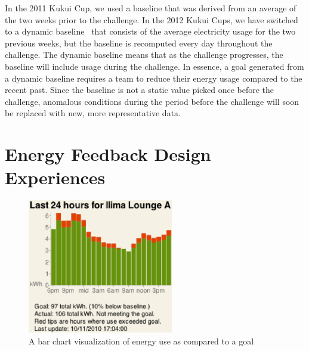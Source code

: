 \documentclass[10pt, conference, compsocconf]{IEEEtran}
\begin{document}
In the 2011 Kukui Cup, we used a baseline that was derived from an average of the two weeks prior to the challenge. In the 2012 Kukui Cups, we have switched to a dynamic baseline~\cite{csdl2-12-08} that consists of the average electricity usage for the two previous weeks, but the baseline is recomputed every day throughout the challenge. The dynamic baseline means that as the challenge progresses, the baseline will include usage during the challenge. In essence, a goal generated from a dynamic baseline requires a team to reduce their energy usage compared to the recent past. Since the baseline is not a static value picked once before the challenge, anomalous conditions during the period before the challenge will soon be replaced with new, more representative data.



\section{Energy Feedback Design Experiences}

\begin{figure}[!tb]
	\centering
	\includegraphics[width=2.5in]{energy-24hours-new.eps}
	\caption{A bar chart visualization of energy use as compared to a goal}
	\label{fig:energy-24hours}
\end{figure}
\end{document}
